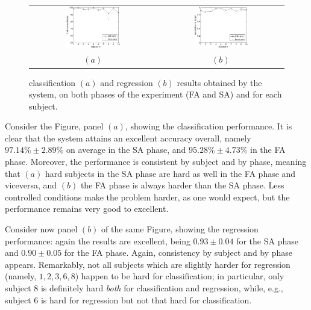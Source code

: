 \begin{figure}[!ht] \centering
  \begin{tabular}{cc}
    \includegraphics[width=0.45\textwidth]{perfClass.eps} &
    \includegraphics[width=0.45\textwidth]{perfRegr.eps} \\
    $(a)$ & $(b)$ \\
  \end{tabular}
  \caption{classification $(a)$ and regression $(b)$ results obtained
    by the system, on both phases of the experiment (FA and SA) and
    for each subject.}
  \label{fig:results}
\end{figure}

Consider the Figure, panel $(a)$, showing the classification
performance. It is clear that the system attains an excellent accuracy
overall, namely $97.14\% \pm 2.89\%$ on average in the SA phase, and
$95.28\% \pm 4.73\%$ in the FA phase. Moreover, the performance is
consistent by subject and by phase, meaning that $(a)$ hard subjects
in the SA phase are hard as well in the FA phase and viceversa, and
$(b)$ the FA phase is always harder than the SA phase. Less controlled
conditions make the problem harder, as one would expect, but the
performance remains very good to excellent.

Consider now panel $(b)$ of the same Figure, showing the regression
performance: again the results are excellent, being $0.93
\pm 0.04$ for the SA phase and $0.90 \pm 0.05$ for the FA
phase. Again, consistency by subject and by phase appears. Remarkably,
not all subjects which are slightly harder for regression (namely,
$1,2,3,6,8$) happen to be hard for classification; in particular, only
subject $8$ is definitely hard \emph{both} for classification and
regression, while, e.g., subject $6$ is hard for regression but not
that hard for classification.

